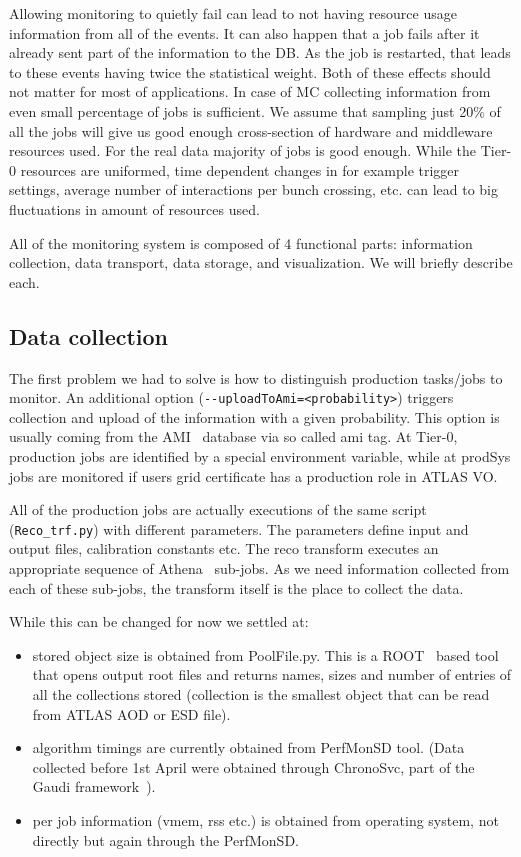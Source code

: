 \documentclass[a4paper]{jpconf}
\begin{document}
Allowing monitoring to quietly fail can lead to not having resource usage information from all of the events. It can also happen that a job fails after it already sent part of the information to the DB. As the job is restarted, that leads to these events having twice the statistical weight. Both of these effects should not matter for most of applications. In case of MC collecting information from even small percentage of jobs is sufficient. We assume that sampling just 20\% of all the jobs will give us good enough cross-section of hardware and middleware resources used.  For the real data majority of jobs is good enough. While the Tier-0 resources are uniformed, time dependent changes in for example trigger settings, average number of interactions per bunch crossing, etc. can lead to big fluctuations in amount of resources used.
    
All of the monitoring system is composed of 4 functional parts: information collection, data transport, data storage, and visualization. We will briefly describe each.

\subsection{Data collection}
The first problem we had to solve is how to distinguish production tasks/jobs to monitor. An additional option (\verb#--uploadToAmi=<probability>#) triggers collection and upload of the information with a given probability. This option is usually coming from the AMI~\cite{ami} database via so called ami tag. At Tier-0, production jobs are identified by a special environment variable, while at prodSys jobs are monitored if users grid certificate has a production role in ATLAS VO.   

All of the production jobs are actually executions of the same script (\verb#Reco_trf.py#) with different parameters. The parameters define input and output files, calibration constants etc. The reco transform executes an appropriate sequence of Athena~\cite{athena} sub-jobs. As we need information collected from each of these sub-jobs, the transform itself is the place to collect the data.

While this can be changed for now we settled at:
\begin{itemize}
	\item stored object size is obtained from PoolFile.py. This is a ROOT~\cite{root} based tool that opens output root files and returns names, sizes and number of entries of all the collections stored (collection is the smallest object that can be read from ATLAS AOD or ESD file).
    \item algorithm timings are currently obtained from PerfMonSD tool. (Data collected before 1st April were obtained through ChronoSvc, part of the Gaudi framework~\cite{gaudi}).
    \item per job information (vmem, rss etc.) is obtained from operating system, not directly but again through the PerfMonSD.
\end{itemize}
\end{document}
